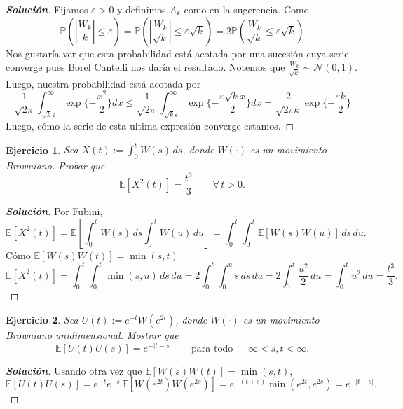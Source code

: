 \documentclass[11pt]{article}
\theoremstyle{ejstyle}
\newtheorem{ejercicio}{Ejercicio}
\newenvironment{solucion}
{\begin{proof}[{\bfseries\color{deepindigo} Solución}]}
	{\end{proof}}
\renewcommand{\P}{\mathbb{P}}
\newcommand{\E}{\mathbb{E}}
\begin{document}
	\begin{solucion}
		Fijamos $\varepsilon > 0$ y definimos $A_k$ como en la sugerencia.
		Como 
		$$ 
		\P(|\frac{W_k}{k}| \leq \varepsilon) = \P(|\frac{W_k}{\sqrt{k}}| \leq \varepsilon \sqrt{k}) = 2 \P(\frac{W_k}{\sqrt{k}} \leq \varepsilon \sqrt{k})
		$$
		Nos gustaría ver que esta probabilidad está acotada por una sucesión cuya serie converge pues Borel Cantelli nos daría el resultado. Notemos que $\frac{W_k}{\sqrt{k}} \sim \mathcal{N}(0,1)$. Luego, nuestra probabilidad está acotada por 
		$$
		\frac{1}{\sqrt{2\pi}}\int_{\sqrt{k}\varepsilon}^{\infty} \exp\{-\frac{x^2}{2}\}dx \leq \frac{1}{\sqrt{2\pi}}\int_{\sqrt{k}\varepsilon}^{\infty} \exp\{-\frac{\varepsilon\sqrt{k}x}{2}\}dx = \frac{2}{\sqrt{2\pi k}} \exp\{-\frac{\varepsilon k}{2}\}   
		$$
		Luego, cómo la serie de esta ultima expresión converge estamos.
	\end{solucion}
	
	\begin{ejercicio}
		Sea $X(t) := \int_0^t W(s)\,ds$, donde $W(\cdot)$ es un movimiento Browniano.
		Probar que
		\[
		\E\!\left[X^2(t)\right] = \frac{t^3}{3} \qquad \forall\, t > 0.
		\]
	\end{ejercicio}
	
	\begin{solucion}
		Por Fubini,
		\[
		\E\!\left[X^2(t)\right]
		= \E\!\left[\int_0^t W(s)\,ds \int_0^t W(u)\,du\right]
		= \int_0^t\!\int_0^t \E[W(s)W(u)]\,ds\,du.
		\]
		Cómo $\E[W(s)W(t)] = \min(s,t)$
		\[
		\E\!\left[X^2(t)\right]
		= \int_0^t\!\int_0^t \min(s,u)\,ds\,du
		= 2\int_0^t\!\int_0^u s\,ds\,du
		= 2\int_0^t \frac{u^2}{2}\,du
		= \int_0^t u^2\,du
		= \frac{t^3}{3}.
		\]
	\end{solucion}
	
	\begin{ejercicio}
		Sea $U(t) := e^{-t}W(e^{2t})$, donde $W(\cdot)$ es un movimiento Browniano
		unidimensional. Mostrar que
		\[
		\E[U(t)U(s)] = e^{-|t-s|} \qquad \text{para todo } -\infty < s,t < \infty.
		\]
	\end{ejercicio}
	
	\begin{solucion}
		Usando otra vez que $\E[W(s)W(t)] = \min(s,t)$,
		\[
		\E[U(t)U(s)]
		= e^{-t}e^{-s}\,\E\!\left[W(e^{2t})W(e^{2s})\right]
		= e^{-(t+s)}\min(e^{2t}, e^{2s}) = e^{-|t-s|}.
		\]
	\end{solucion}
	
\end{document}
